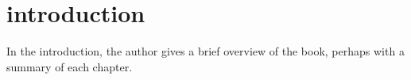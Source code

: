 \chapter{\Gls{introduction}}

In the introduction, the author gives a brief overview of the book, perhaps with a summary of each chapter.
